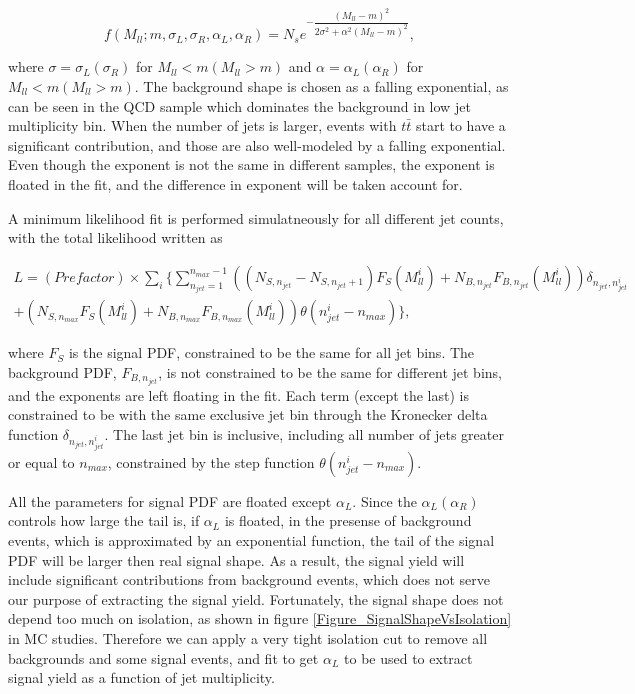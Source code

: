 \documentclass{cmspaper2}
\begin{document}
\begin{equation}
f(M_{ll}; m, \sigma_L, \sigma_R, \alpha_L, \alpha_R) = N_s e^{-\dfrac{(M_{ll} - m)^2}{2 \sigma^2 + \alpha^2 (M_{ll} - m)^2}},\nonumber
\end{equation}

where $\sigma = \sigma_L (\sigma_R)$ for $M_{ll} < m (M_{ll} > m)$ and $\alpha = \alpha_L (\alpha_R)$ for $M_{ll} < m (M_{ll} > m)$.
The background shape is chosen as a falling exponential, as can be seen in the QCD sample which dominates the background in low
jet multiplicity bin.  When the number of jets is larger, events with $t\bar{t}$ start to have a significant contribution, and those are
also well-modeled by a falling exponential.
Even though the exponent is not the same in different samples, the exponent is floated in the fit, and the difference in exponent will be taken account for.

A minimum likelihood fit is performed simulatneously for all different jet counts, with the total likelihood written as

\begin{eqnarray}
L = (Prefactor) \times \displaystyle\sum_i \{ \displaystyle\sum_{n_{jet}=1}^{n_{max} - 1} \left( (N_{S, n_{jet}} - N_{S, n_{jet} + 1}) F_S(M_{ll}^i) + N_{B, n_{jet}} F_{B, n_{jet}}(M_{ll}^i) \right)
\delta_{n_{jet}, n_{jet}^i}\nonumber\\
+ \left( N_{S, n_{max}} F_S(M_{ll}^i) + N_{B, n_{max}} F_{B, n_{max}}(M_{ll}^i) \right) \theta(n_{jet}^i - n_{max}) \},
\nonumber
\end{eqnarray}

where $F_S$ is the signal PDF, constrained to be the same for all jet bins.  The background PDF, $F_{B, n_{jet}}$, is not constrained to
be the same for different jet bins, and the exponents are left floating in the fit.  Each term (except the last) is constrained to be with the same exclusive jet bin
through the Kronecker delta function $\delta_{n_{jet}, n_{jet}^i}$.
The last jet bin is inclusive, including all number of jets greater or equal to $n_{max}$, constrained by the step function $\theta(n_{jet}^i - n_{max})$.

All the parameters for signal PDF are floated except $\alpha_L$.  Since the $\alpha_L (\alpha_R)$ controls how large the tail is, if $\alpha_L$ is floated,
in the presense of background events, which is approximated by an exponential function, the tail of the signal PDF will be larger then real signal shape.
As a result, the signal yield will include significant contributions from background events, which does not serve our purpose of extracting the signal yield.
Fortunately, the signal shape does not depend too much on isolation, as shown in figure \ref{Figure_SignalShapeVsIsolation} in MC studies.
Therefore we can apply a very tight isolation cut to remove all backgrounds and some signal events, and fit to get $\alpha_L$ to be used to extract signal yield
as a function of jet multiplicity.
\end{document}
